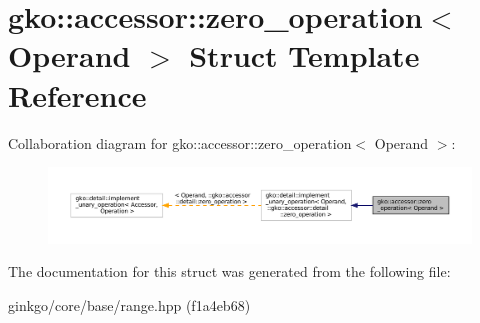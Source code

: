 \hypertarget{structgko_1_1accessor_1_1zero__operation}{}\section{gko\+:\+:accessor\+:\+:zero\+\_\+operation$<$ Operand $>$ Struct Template Reference}
\label{structgko_1_1accessor_1_1zero__operation}


Collaboration diagram for gko\+:\+:accessor\+:\+:zero\+\_\+operation$<$ Operand $>$\+:
\nopagebreak
\begin{figure}[H]
\begin{center}
\leavevmode
\includegraphics[width=350pt]{structgko_1_1accessor_1_1zero__operation__coll__graph}
\end{center}
\end{figure}


The documentation for this struct was generated from the following file\+:\begin{DoxyCompactItemize}
\item 
ginkgo/core/base/range.\+hpp (f1a4eb68)\end{DoxyCompactItemize}
